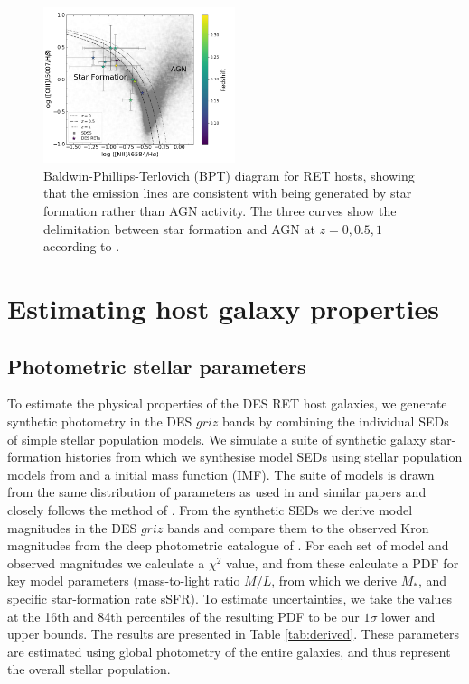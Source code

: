 \documentclass[fleqn,usenatbib,]{mnras}
\newcommand{\replylluis}[1]{\color{brown}#1 \color{black}}
\begin{document}
\begin{figure}
\includegraphics[width=0.5\textwidth]{figs/RET_BPT.png}
\caption{Baldwin-Phillips-Terlovich (BPT) diagram for RET hosts, showing that the emission lines are consistent with being generated by star formation rather than AGN activity. The three curves show the delimitation between star formation and AGN at $z =0, 0.5, 1$ according to \citet{Kewley2013}.
\label{fig:bpt}}
\end{figure}

\section{Estimating host galaxy properties}
\label{sec:measure}
\subsection{Photometric stellar parameters \label{subsec:sedfit}}
To estimate the physical properties of the DES RET host galaxies, we generate synthetic photometry in the DES $griz$ bands by combining the individual SEDs of simple stellar population models. We simulate a suite of synthetic galaxy star-formation histories from which we synthesise model SEDs using stellar population models from \citet{Bruzual2003}  and a \citet{Chabrier2003} initial mass function (IMF).  The suite of models is drawn from the same distribution of parameters as used in \citet{Kauffmann2003} and similar papers \citep[e.g.][]{Gallazzi2005,Gallazzi2009} and closely follows the method of \citet{Childress2013}. From the synthetic SEDs we derive model magnitudes in the DES $griz$ bands and compare them to the observed \replylluis{Kron} magnitudes \replylluis{from the deep photometric catalogue of \citet{Wiseman2020}}. For each set of model and observed magnitudes we calculate a $\chi^2$ value, and from these calculate a PDF for key model parameters (mass-to-light ratio $M/L$, from which we derive $M_*$, and specific star-formation rate sSFR). To estimate uncertainties, we take the values at the 16th and 84th percentiles of the resulting PDF to be our $1\sigma$ lower and upper bounds. The results are presented in Table \ref{tab:derived}. \replylluis{These parameters are estimated using global photometry of the entire galaxies, and thus represent the overall stellar population.}
\end{document}
